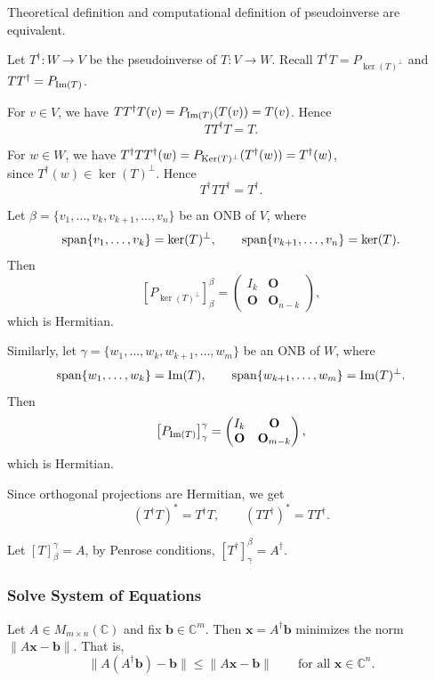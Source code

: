 \begin{theorem}
    Theoretical definition and computational definition of pseudoinverse are equivalent.
\end{theorem}

\begin{pfbox}
Let $T^\dagger:W\to V$ be the pseudoinverse of $T:V\to W$.
Recall $T^\dagger T=P_{\ker(T)^\perp}$ and $TT^\dagger=P_{\operatorname{Im}(T)}$.

For $v\in V$, we have 
$TT^\dagger T(v)=P_{\operatorname{Im}(T)}(T(v))=T(v)$. Hence
\[
TT^\dagger T=T.
\]

For $w\in W$, we have
$T^\dagger TT^\dagger(w)
=P_{\operatorname{Ker}(T)^\perp}(T^\dagger(w))
=T^\dagger(w)$,\\
since $T^\dagger(w)\in\ker(T)^\perp$. Hence
\[
T^\dagger TT^\dagger=T^\dagger.
\]


Let $\beta=\{v_1,\dots,v_k,v_{k+1},\dots,v_n\}$ be an ONB of $V$, where
\[
\operatorname{span}\{v_1,\dots,v_k\}=\ker(T)^\perp,
\qquad
\operatorname{span}\{v_{k+1},\dots,v_n\}=\ker(T).
\]
Then
\[
\left[P_{\ker(T)^\perp}\right]_{\beta}^{\beta}
=
\begin{pmatrix}
I_k & \mathbf{O}\\
\mathbf{O} & \mathbf{O}_{n-k}
\end{pmatrix},
\]
which is Hermitian.

Similarly, let $\gamma=\{w_1,\dots,w_k,w_{k+1},\dots,w_m\}$
be an ONB of $W$, where
\[
\operatorname{span}\{w_1,\dots,w_k\}=\operatorname{Im}(T),
\qquad
\operatorname{span}\{w_{k+1},\dots,w_m\}=\operatorname{Im}(T)^\perp.
\]
Then
\[
\left[P_{\operatorname{Im}(T)}\right]_{\gamma}^{\gamma}
=
\begin{pmatrix}
I_k & \mathbf{O}\\
\mathbf{O} & \mathbf{O}_{m-k}
\end{pmatrix},
\]
which is Hermitian.

Since orthogonal projections are Hermitian, we get
\[
(T^\dagger T)^*=T^\dagger T,
\qquad
(TT^\dagger)^*=TT^\dagger.
\]

Let $[T]_{\beta}^{\gamma}=A$, by Penrose conditions, $[T^\dagger]_{\gamma}^{\beta}=A^\dagger$.
\end{pfbox}

\subsubsection*{Solve System of Equations}

\begin{theorem}
Let $A\in M_{m\times n}(\mathbb{C})$ and fix $\mathbf{b}\in \mathbb{C}^m$.
Then $\mathbf{x}=A^\dagger\mathbf{b}$ minimizes the norm
$\|A\mathbf{x}-\mathbf{b}\|$.
That is,
\[
\|A(A^\dagger\mathbf{b})-\mathbf{b}\|
\le
\|A\mathbf{x}-\mathbf{b}\|
\qquad
\text{for all } \mathbf{x}\in \mathbb{C}^n.
\]
\label{least square method}
\end{theorem}

